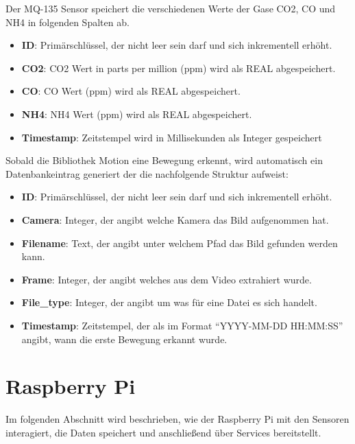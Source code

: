 Der MQ-135 Sensor speichert die verschiedenen Werte der Gase CO2, CO und NH4 in folgenden Spalten ab.
\begin{itemize}
	\item \textbf{ID}: Primärschlüssel, der nicht leer sein darf und sich inkrementell erhöht.  
	\item \textbf{CO2}: CO2 Wert in parts per million (ppm) wird als REAL abgespeichert.
	\item \textbf{CO}: CO Wert (ppm) wird als REAL abgespeichert.
	\item \textbf{NH4}: NH4 Wert (ppm) wird als REAL abgespeichert. 
	\item \textbf{Timestamp}: Zeitstempel wird in Millisekunden als Integer gespeichert
\end{itemize}

Sobald die Bibliothek Motion eine Bewegung erkennt, wird automatisch ein Datenbankeintrag generiert der die nachfolgende Struktur aufweist:
\begin{itemize}
	\item \textbf{ID}: Primärschlüssel, der nicht leer sein darf und sich inkrementell erhöht.  
	\item \textbf{Camera}: Integer, der angibt welche Kamera das Bild aufgenommen hat.
	\item \textbf{Filename}: Text, der angibt unter welchem Pfad das Bild gefunden werden kann.
	\item \textbf{Frame}: Integer, der angibt welches aus dem Video extrahiert wurde. 
	\item \textbf{File\_type}: Integer, der angibt um was für eine Datei es sich handelt.
	\item \textbf{Timestamp}: Zeitstempel, der als im Format \enquote{YYYY-MM-DD HH:MM:SS} angibt, wann die erste Bewegung erkannt wurde.	
\end{itemize}


\section{Raspberry Pi} 
Im folgenden Abschnitt wird beschrieben, wie der Raspberry Pi mit den Sensoren interagiert, die Daten speichert und anschließend über Services bereitstellt.

